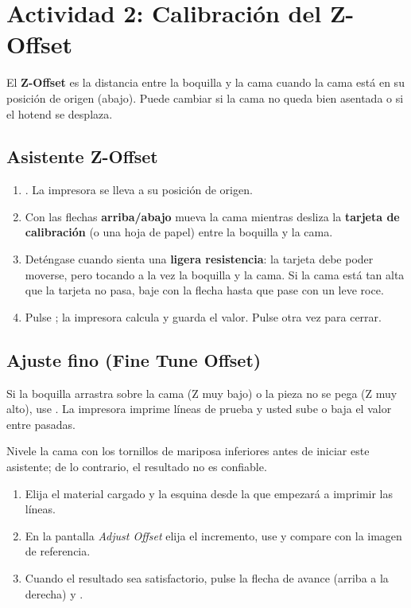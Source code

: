\newpage
\section{Actividad 2: Calibración del Z-Offset}

El \textbf{Z-Offset} es la distancia entre la boquilla y la cama cuando la cama está en su posición de origen (abajo). Puede cambiar si la cama no queda bien asentada o si el hotend se desplaza.

\subsection*{Asistente Z-Offset}

\begin{enumerate}
    \item {}\flecha{}\flecha{}. La impresora se lleva a su posición de origen.
    \item Con las flechas \textbf{arriba/abajo} mueva la cama mientras desliza la \textbf{tarjeta de calibración} (o una hoja de papel) entre la boquilla y la cama.
    \item Deténgase cuando sienta una \textbf{ligera resistencia}: la tarjeta debe poder moverse, pero tocando a la vez la boquilla y la cama. Si la cama está tan alta que la tarjeta no pasa, baje con la flecha hasta que pase con un leve roce.
    \item Pulse ; la impresora calcula y guarda el valor. Pulse  otra vez para cerrar.
\end{enumerate}

\subsection*{Ajuste fino (Fine Tune Offset)}

Si la boquilla arrastra sobre la cama (Z muy bajo) o la pieza no se pega (Z muy alto), use \flecha{}\flecha{}. La impresora imprime líneas de prueba y usted sube o baja el valor entre pasadas.

\begin{warningbox}
Nivele la cama con los tornillos de mariposa inferiores antes de iniciar este asistente; de lo contrario, el resultado no es confiable.
\end{warningbox}

\begin{enumerate}
    \item Elija el material cargado y la esquina desde la que empezará a imprimir las líneas.
    \item En la pantalla \emph{Adjust Offset} elija el incremento, use  y compare con la imagen de referencia.
    \item Cuando el resultado sea satisfactorio, pulse la flecha de avance (arriba a la derecha) y .
\end{enumerate}

